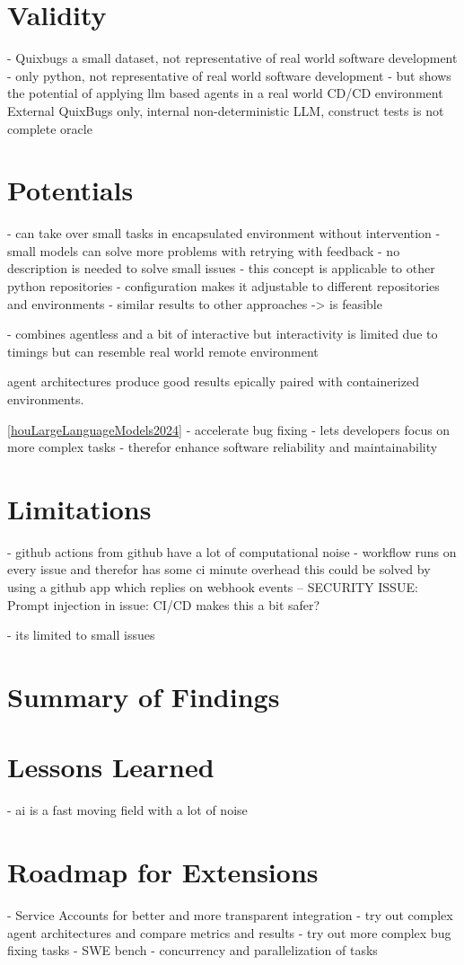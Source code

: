 \section{Validity}

- Quixbugs a small dataset, not representative of real world software development
- only python, not representative of real world software development
- but shows the potential of applying llm based agents in a real world CD/CD environment
External QuixBugs only, internal non-deterministic LLM, construct tests is not complete oracle

\section{Potentials}
- can take over small tasks in encapsulated environment without intervention
- small models can solve more problems with retrying with feedback
- no description is needed to solve small issues
- this concept is applicable to other python repositories
- configuration makes it adjustable to different repositories and environments
- similar results to other approaches -> is feasible

- combines agentless and a bit of interactive but interactivity is limited due to timings but can resemble real world remote environment

agent architectures produce good results epically paired with containerized environments. \cite{puvvadiCodingAgentsComprehensive2025}

\ref{houLargeLanguageModels2024}
- accelerate bug fixing
- lets developers focus on more complex tasks
- therefor enhance software reliability and maintainability

\section{Limitations}
- github actions from github have a lot of computational noise
- workflow runs on every issue and therefor has some ci minute overhead this could be solved by using a github app which replies on webhook events
-- SECURITY ISSUE: Prompt injection in issue: CI/CD makes this a bit safer?

- its limited to small issues

\section{Summary of Findings}

\section{Lessons Learned}
- ai is a fast moving field with a lot of noise


\section{Roadmap for Extensions}
- Service Accounts for better and more transparent integration
- try out complex agent architectures and compare metrics and results
- try out more complex bug fixing tasks - SWE bench
- concurrency and parallelization of tasks